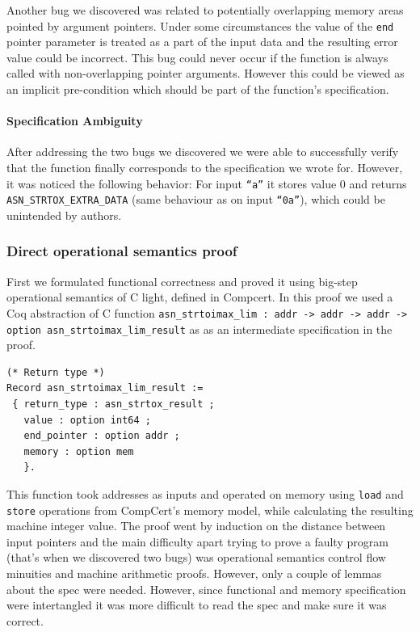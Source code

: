 \documentclass[acmsmall,nonacm]{acmart}
\begin{document}
Another bug we discovered was related to potentially overlapping
memory areas pointed by argument pointers. Under some circumstances
the value of the \texttt{end} pointer parameter is treated as a part
of the input data and the resulting error value could be
incorrect. This bug could never occur if the function is always called
with non-overlapping pointer arguments. However this could be viewed
as an implicit pre-condition which should be part of the function's
specification.

\paragraph{Specification Ambiguity}

After addressing the two bugs we discovered we were able to
successfully verify that the function finally corresponds to the
specification we wrote for. However, it was noticed the following
behavior: For input \texttt{``a''} it stores value 0 and returns {\color{green}\texttt{ASN\_STRTOX\_EXTRA\_DATA}} (same behaviour as on input \texttt{``0a''}), which could be unintended by authors. \\

  
\subsubsection{Direct operational semantics proof}
First we formulated functional correctness and proved it using big-step operational semantics of C light, defined in Compcert. In this proof we used a Coq abstraction of C function \texttt{asn\_strtoimax\_lim : addr -> addr -> addr -> option asn\_strtoimax\_lim\_result} as as an intermediate specification in the proof. 

\begin{lstlisting}[language=Coq]
(* Return type *)
Record asn_strtoimax_lim_result :=
 { return_type : asn_strtox_result ;
   value : option int64 ;
   end_pointer : option addr ;
   memory : option mem 
   }.

\end{lstlisting}

This function took addresses as inputs and operated on memory using \texttt{load} and \texttt{store} operations from CompCert's memory model, while calculating the resulting machine integer value. The proof went by induction on the distance between input pointers and the main difficulty apart trying to prove a faulty program (that's when we discovered two bugs) was operational semantics control flow minuities and machine arithmetic proofs. However, only a couple of lemmas about the spec were needed. However, since functional and memory specification were intertangled it was more difficult to read the spec and make sure it was correct. 
\end{document}
